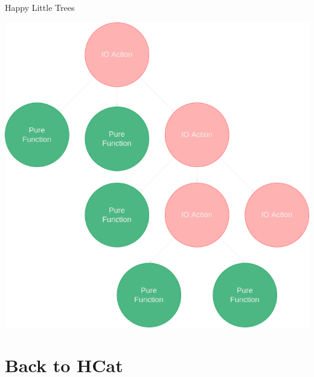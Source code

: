 \documentclass[10pt, presentation, colorlinks]{beamer}
\begin{document}
\begin{frame}[label={sec:org7fe4090}]{Happy Little Trees}
\begin{center}
\includegraphics[height=0.6\textheight]{img/tree.png}
\end{center}
\end{frame}

\section{Back to HCat}
\label{sec:orgb2fb40e}
\end{document}
